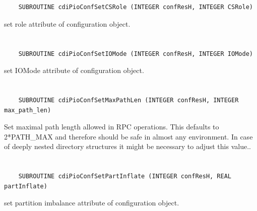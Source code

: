 \section*{\tt {}}

\begin{verbatim}
    SUBROUTINE cdiPioConfSetCSRole (INTEGER confResH, INTEGER CSRole)
\end{verbatim}

set role attribute of configuration object.


\section*{\tt {}}

\begin{verbatim}
    SUBROUTINE cdiPioConfSetIOMode (INTEGER confResH, INTEGER IOMode)
\end{verbatim}

set IOMode attribute of configuration object.


\section*{\tt {}}

\begin{verbatim}
    SUBROUTINE cdiPioConfSetMaxPathLen (INTEGER confResH, INTEGER max_path_len)
\end{verbatim}

Set maximal path length allowed in RPC
operations. This defaults to 2*PATH_MAX and therefore should be
safe in almost any environment. In case of deeply nested directory
structures it might be necessary to adjust this value..


\section*{\tt {}}

\begin{verbatim}
    SUBROUTINE cdiPioConfSetPartInflate (INTEGER confResH, REAL partInflate)
\end{verbatim}

set partition imbalance attribute of
configuration object.


\section*{\tt {}}

